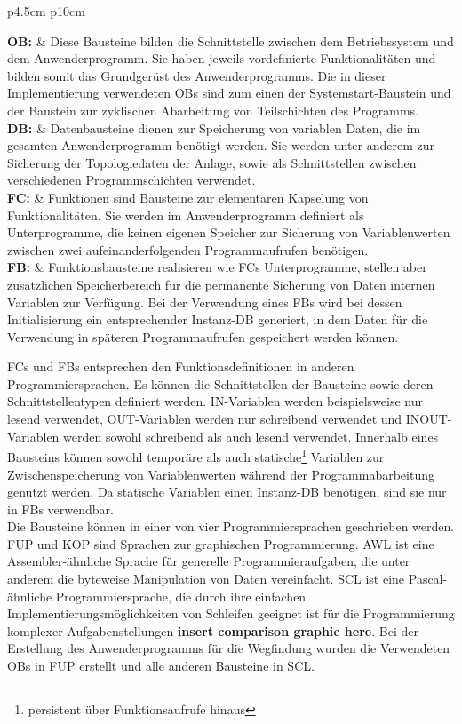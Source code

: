 			\begin{tabular}{{p{4.5cm} p{10cm}}}
				
				\textbf{\ac{OB}:} & Diese Bausteine bilden die Schnittstelle zwischen dem Betriebssystem und dem Anwenderprogramm. Sie haben jeweils vordefinierte Funktionalitäten und bilden somit das Grundgerüst des Anwenderprogramms. Die in dieser Implementierung verwendeten \ac{OB}s sind zum einen der Systemstart-Baustein und der Baustein zur zyklischen Abarbeitung von Teilschichten des Programms.\\[0.5cm]
				\textbf{\ac{DB}:} & Datenbausteine dienen zur Speicherung von variablen Daten, die im gesamten Anwenderprogramm benötigt werden. Sie werden unter anderem zur Sicherung der Topologiedaten der Anlage, sowie als Schnittstellen zwischen verschiedenen Programmschichten verwendet.\\[0.5cm]
				\textbf{\ac{FC}:} & Funktionen sind Bausteine zur elementaren Kapselung von Funktionalitäten. Sie werden im Anwenderprogramm definiert als Unterprogramme, die keinen eigenen Speicher zur Sicherung von Variablenwerten zwischen zwei aufeinanderfolgenden Programmaufrufen benötigen.\\[0.5cm]
				\textbf{\ac{FB}:} & Funktionsbausteine realisieren wie \ac{FC}s Unterprogramme, stellen aber zusätzlichen Speicherbereich für die permanente Sicherung von Daten internen Variablen zur Verfügung. Bei der Verwendung eines \ac{FB}s wird bei dessen Initialisierung ein entsprechender Instanz-\ac{DB} generiert, in dem Daten für die Verwendung in späteren Programmaufrufen gespeichert werden können.\\[0.5cm]
				
			\end{tabular}
			
			\ac{FC}s und \ac{FB}s entsprechen den Funktionsdefinitionen in anderen Programmiersprachen. Es können die Schnittstellen der Bausteine sowie deren Schnittstellentypen definiert werden. IN-Variablen werden beispielsweise nur lesend verwendet, OUT-Variablen werden nur schreibend verwendet und INOUT-Variablen werden sowohl schreibend als auch lesend verwendet. Innerhalb eines Bausteins können sowohl temporäre als auch statische\footnote{persistent über Funktionsaufrufe hinaus} Variablen zur Zwischenspeicherung von Variablenwerten während der Programmabarbeitung genutzt werden. Da statische Variablen einen Instanz-\ac{DB} benötigen, sind sie nur in \ac{FB}s verwendbar.\\
			
			Die Bausteine können in einer von vier Programmiersprachen geschrieben werden. \ac{FUP} und \ac{KOP} sind Sprachen zur graphischen Programmierung. \ac{AWL} ist eine Assembler-ähnliche Sprache für generelle Programmieraufgaben, die unter anderem die byteweise Manipulation von Daten vereinfacht. \ac{SCL} ist eine Pascal-ähnliche Programmiersprache, die durch ihre einfachen Implementierungsmöglichkeiten von Schleifen geeignet ist für die Programmierung komplexer Aufgabenstellungen \textbf{insert comparison graphic here}. Bei der Erstellung des Anwenderprogramms für die Wegfindung wurden die Verwendeten \ac{OB}s in \ac{FUP} erstellt und alle anderen Bausteine in SCL.
			
